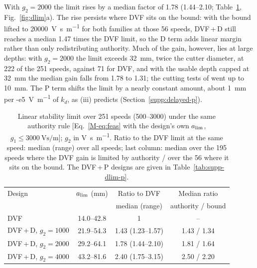 With $g_2=2000$ the limit rises by a median factor of 1.78 (1.44--2.10; Table~\ref{tab:dlim}, Fig.~\ref{fig:dlim}a). The rise persists where DVF sits on the bound: with the bound lifted to \SI{20000}{\volt\second\per\metre} for both families at those 56 speeds, DVF\,+\,D still reaches a median 1.47 times the DVF limit, so the D term adds linear margin rather than only redistributing authority. Much of the gain, however, lies at large depths: with $g_2=2000$ the limit exceeds \SI{32}{\milli\metre}, twice the cutter diameter, at 222 of the 251 speeds, against 71 for DVF, and with the usable depth capped at \SI{32}{\milli\metre} the median gain falls from 1.78 to 1.31; the cutting tests of \citet{ozsoy2026robust} went up to \SI{10}{\milli\metre}. The P term shifts the limit by a nearly constant amount, about \SI{1}{\milli\metre} per \SI{-e5}{\volt\per\metre} of $k_d$, as (iii) predicts (Section~\ref{supp:delayed-p}).

\begin{table}[!htbp]
  \centering
  \caption{Linear stability limit over 251 speeds (\SIrange{500}{3000}{\rpm}) under the same authority rule [Eq.~\eqref{M-eq:feas} with the design's own $a_{\lim}$, $g_1\le\SI{3000}{\volt\second\per\metre}$]; $g_2$ in \si{\volt\second\per\metre}. Ratio to the DVF limit at the same speed: median (range) over all speeds; last column: median over the 195 speeds where the DVF gain is limited by authority / over the 56 where it sits on the bound. The DVF\,+\,P designs are given in Table~\ref{tab:supp-dlim-p}.}
  \label{tab:dlim}
  \small
  \begin{tabular}{@{}lccc@{}}
    \toprule
    Design & $a_{\lim}$ (\si{\milli\metre}) & Ratio to DVF & Median ratio\\
     & & median (range) & authority / bound\\
    \midrule
    DVF & 14.0--42.8 & 1 & --\\
    DVF\,+\,D, $g_2=1000$ & 21.9--54.3 & 1.43 (1.23--1.57) & 1.43 / 1.34\\
    DVF\,+\,D, $g_2=2000$ & 29.2--64.1 & 1.78 (1.44--2.10) & 1.81 / 1.64\\
    DVF\,+\,D, $g_2=4000$ & 43.2--81.6 & 2.40 (1.75--3.15) & 2.50 / 2.20\\
    \bottomrule
  \end{tabular}
\end{table}



